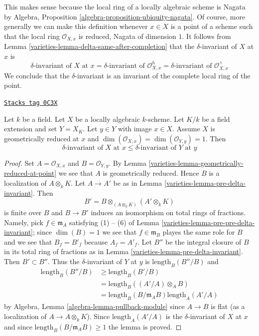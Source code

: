 This makes sense because the local ring of a locally
algebraic scheme is Nagata by
Algebra, Proposition \ref{algebra-proposition-ubiquity-nagata}.
Of course, more generally we can make this definition
whenever $x \in X$ is a point of a scheme such that
the local ring $\mathcal{O}_{X, x}$ is reduced, Nagata of dimension $1$.
It follows from Lemma \ref{varieties-lemma-delta-same-after-completion}
that the $\delta$-invariant of $X$ at $x$ is
$$
\delta\text{-invariant of }X\text{ at }x =
\delta\text{-invariant of }\mathcal{O}_{X, x}^h =
\delta\text{-invariant of }\mathcal{O}_{X, x}^\wedge
$$
We conclude that the $\delta$-invariant is an invariant
of the complete local ring of the point.

\begin{lemma}
\label{varieties-lemma-delta-invariant-and-change-of-fields}
\href{https://stacks.math.columbia.edu/tag/0C3X}{\texttt{Stacks tag 0C3X}}

Let $k$ be a field. Let $X$ be a locally algebraic $k$-scheme.
Let $K/k$ be a field extension and set $Y = X_K$.
Let $y \in Y$ with image $x \in X$.
Assume $X$ is geometrically reduced at $x$ and
$\dim(\mathcal{O}_{X, x}) = \dim(\mathcal{O}_{Y, y}) = 1$.
Then
$$
\delta\text{-invariant of }X\text{ at }x \leq
\delta\text{-invariant of }Y\text{ at }y
$$
\end{lemma}

\begin{proof}

Set $A = \mathcal{O}_{X, x}$ and $B = \mathcal{O}_{Y, y}$.
By Lemma \ref{varieties-lemma-geometrically-reduced-at-point}
we see that $A$ is geometrically reduced.
Hence $B$ is a localization of $A \otimes_k K$.
Let $A \to A'$ be as in Lemma \ref{varieties-lemma-pre-delta-invariant}.
Then
$$
B' = B \otimes_{(A \otimes_k K)} (A' \otimes_k K)
$$
is finite over $B$ and $B \to B'$ induces
an isomorphism on total rings of fractions. Namely, pick $f \in \mathfrak m_A$
satisfying (1) -- (6) of Lemma \ref{varieties-lemma-pre-pre-delta-invariant};
since $\dim(B) = 1$ we see that $f \in \mathfrak m_B$
playes the same role for $B$ and we see that $B_f = B'_f$ because $A_f = A'_f$.
Let $B''$ be the integral closure of $B$ in its
total ring of fractions as in Lemma \ref{varieties-lemma-pre-delta-invariant}.
Then $B' \subset B''$. Thus the $\delta$-invariant of $Y$ at $y$ is
$\text{length}_B(B''/B)$ and
\begin{align*}
\text{length}_B(B''/B)
& \geq
\text{length}_B(B'/B) \\
& =
\text{length}_B((A'/A) \otimes_A B) \\
& =
\text{length}_B(B/\mathfrak m_A B) \text{length}_A(A'/A)
\end{align*}
by Algebra, Lemma \ref{algebra-lemma-pullback-module}
since $A \to B$ is flat (as a localization of $A \to A \otimes_k K$).
Since $\text{length}_A(A'/A)$ is the $\delta$-invariant of $X$ at $x$
and since
$\text{length}_B(B/\mathfrak m_A B) \geq 1$ the lemma is proved.
\end{proof}

